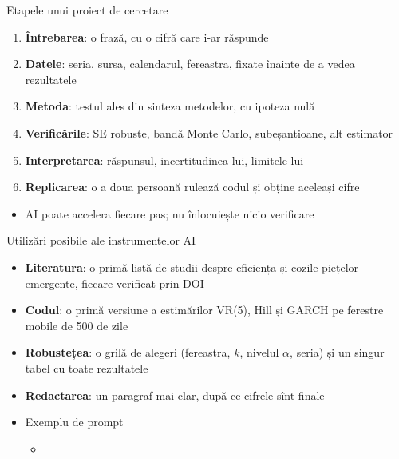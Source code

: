 \begin{frame}{Etapele unui proiect de cercetare}
\itemsize{\small}
\begin{enumerate}
    \item \textbf{Întrebarea}: o frază, cu o cifră care i-ar răspunde
    \item \textbf{Datele}: seria, sursa, calendarul, fereastra, fixate înainte de a vedea rezultatele
    \item \textbf{Metoda}: testul ales din sinteza metodelor, cu ipoteza nulă
    \item \textbf{Verificările}: SE robuste, bandă Monte Carlo, subeșantioane, alt estimator
    \item \textbf{Interpretarea}: răspunsul, incertitudinea lui, limitele lui
    \item \textbf{Replicarea}: o a doua persoană rulează codul și obține aceleași cifre
\end{enumerate}
\begin{itemize}
    \item AI poate accelera fiecare pas; nu înlocuiește nicio verificare 
\end{itemize}
\end{frame}

\begin{frame}{Utilizări posibile ale instrumentelor AI}
\itemsize{\small}
\begin{itemize}
    \item \textbf{Literatura}: o primă listă de studii despre eficiența și cozile piețelor emergente, fiecare verificat prin DOI
    \item \textbf{Codul}: o primă versiune a estimărilor VR(5), Hill și GARCH pe ferestre mobile de 500 de zile
    \item \textbf{Robustețea}: o grilă de alegeri (fereastra, $k$, nivelul $\alpha$, seria) și un singur tabel cu toate rezultatele
    \item \textbf{Redactarea}: un paragraf mai clar, după ce cifrele sînt finale
    \item Exemplu de prompt
    \begin{itemize}
        \item {}
    \end{itemize}
\end{itemize}
\end{frame}

